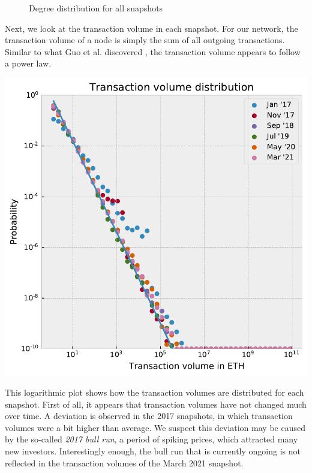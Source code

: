 \documentclass[10pt,a4paper]{article}
\newenvironment{Figure}
  {\par\medskip\noindent\minipage{\linewidth}}
  {\endminipage\par\medskip}
\begin{document}
\begin{figure}[h]
\begin{minipage}[t]{.33\textwidth}
\end{minipage}%
\caption{Degree distribution for all snapshots}
\label{tbl-degreedistributions}
\end{figure}

\begin{multicols}{2}
Next, we look at the transaction volume in each snapshot. For our network, the transaction volume of a node is simply the sum of all outgoing transactions. Similar to what Guo et al. discovered \cite{GUO201958}, the transaction volume appears to follow a power law.

\begin{Figure}
\centering
\includegraphics[scale=0.53]{figures/transaction_volume.pdf}
\end{Figure}

This logarithmic plot shows how the transaction volumes are distributed for each snapshot. First of all, it appears that transaction volumes have not changed much over time. A deviation is observed in the 2017 snapshots, in which transaction volumes were a bit higher than average. We suspect this deviation may be caused by the so-called \textit{2017 bull run}, a period of spiking prices, which attracted many new investors. Interestingly enough, the bull run that is currently ongoing is not reflected in the transaction volumes of the March 2021 snapshot.


\end{multicols}
\end{document}
